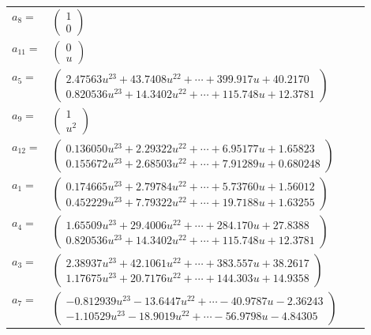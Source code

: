 \documentclass[1p]{elsarticle_modified}
\theoremstyle{definition}
\begin{document}
\begin{tabular}{m{7pt} m{180pt} m{7pt} m{180pt} }
\flushright $a_{8}=$&$\begin{pmatrix}1\\0\end{pmatrix}$ \\
\flushright $a_{11}=$&$\begin{pmatrix}0\\u\end{pmatrix}$ \\
\flushright $a_{5}=$&$\begin{pmatrix}2.47563 u^{23}+43.7408 u^{22}+\cdots+399.917 u+40.2170\\0.820536 u^{23}+14.3402 u^{22}+\cdots+115.748 u+12.3781\end{pmatrix}$ \\
\flushright $a_{9}=$&$\begin{pmatrix}1\\u^2\end{pmatrix}$ \\
\flushright $a_{12}=$&$\begin{pmatrix}0.136050 u^{23}+2.29322 u^{22}+\cdots+6.95177 u+1.65823\\0.155672 u^{23}+2.68503 u^{22}+\cdots+7.91289 u+0.680248\end{pmatrix}$ \\
\flushright $a_{1}=$&$\begin{pmatrix}0.174665 u^{23}+2.79784 u^{22}+\cdots+5.73760 u+1.56012\\0.452229 u^{23}+7.79322 u^{22}+\cdots+19.7188 u+1.63255\end{pmatrix}$ \\
\flushright $a_{4}=$&$\begin{pmatrix}1.65509 u^{23}+29.4006 u^{22}+\cdots+284.170 u+27.8388\\0.820536 u^{23}+14.3402 u^{22}+\cdots+115.748 u+12.3781\end{pmatrix}$ \\
\flushright $a_{3}=$&$\begin{pmatrix}2.38937 u^{23}+42.1061 u^{22}+\cdots+383.557 u+38.2617\\1.17675 u^{23}+20.7176 u^{22}+\cdots+144.303 u+14.9358\end{pmatrix}$ \\
\flushright $a_{7}=$&$\begin{pmatrix}-0.812939 u^{23}-13.6447 u^{22}+\cdots-40.9787 u-2.36243\\-1.10529 u^{23}-18.9019 u^{22}+\cdots-56.9798 u-4.84305\end{pmatrix}$ \\

\end{tabular}
\end{document}
